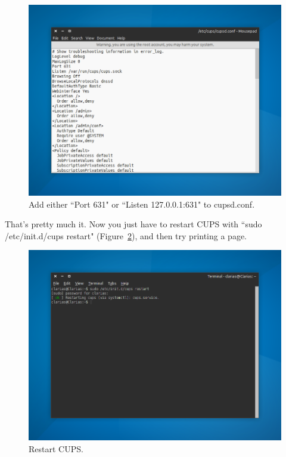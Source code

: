 \documentclass[12pt, a4paper]{article}
\begin{document}
\begin{figure}[!ht]
  \centering
  \includegraphics[width=1\textwidth]{imgs/unable-to-connect-to-server-4.png}
  \caption{Add either ``Port 631" or ``Listen 127.0.0.1:631" to cupsd.conf.}
  \label{fig14}
\end{figure}

\newpage

\noindent That's pretty much it. Now you just have to restart CUPS with ``sudo /etc/init.d/cups restart" (Figure~\ref{fig15}), and then try printing a page. \\

\begin{figure}[!htp]
  \centering
  \includegraphics[width=1\textwidth]{imgs/unable-to-connect-to-server-5.png}
  \caption{Restart CUPS.}
  \label{fig15}
\end{figure}
\end{document}
